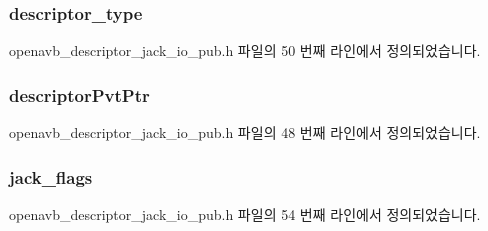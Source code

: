 \subsubsection[{\texorpdfstring{descriptor\+\_\+type}{descriptor_type}}]{ descriptor\+\_\+type}\hypertarget{structopenavb__aem__descriptor__jack__io__t_a1e231d7874aada5925b29affc76782cc}{}\label{structopenavb__aem__descriptor__jack__io__t_a1e231d7874aada5925b29affc76782cc}


openavb\+\_\+descriptor\+\_\+jack\+\_\+io\+\_\+pub.\+h 파일의 50 번째 라인에서 정의되었습니다.

\subsubsection[{\texorpdfstring{descriptor\+Pvt\+Ptr}{descriptorPvtPtr}}]{ descriptor\+Pvt\+Ptr}\hypertarget{structopenavb__aem__descriptor__jack__io__t_a302e92fd6cf4d398d5305395359fb157}{}\label{structopenavb__aem__descriptor__jack__io__t_a302e92fd6cf4d398d5305395359fb157}


openavb\+\_\+descriptor\+\_\+jack\+\_\+io\+\_\+pub.\+h 파일의 48 번째 라인에서 정의되었습니다.

\subsubsection[{\texorpdfstring{jack\+\_\+flags}{jack_flags}}]{ jack\+\_\+flags}\hypertarget{structopenavb__aem__descriptor__jack__io__t_aed741d70a68826371496e4355632dd15}{}\label{structopenavb__aem__descriptor__jack__io__t_aed741d70a68826371496e4355632dd15}


openavb\+\_\+descriptor\+\_\+jack\+\_\+io\+\_\+pub.\+h 파일의 54 번째 라인에서 정의되었습니다.

